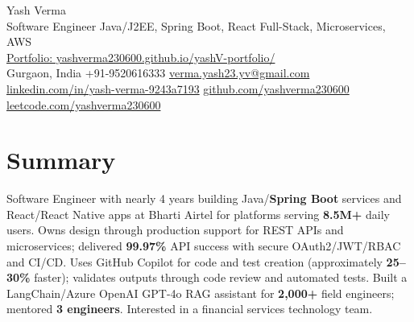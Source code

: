 \documentclass[letterpaper,11pt]{article}
\begin{document}
\begin{center}
  {\Huge Yash Verma} \\
  \small Software Engineer \textbar{} Java/J2EE, Spring Boot, React \textbar{} Full-Stack, Microservices, AWS \\
  \href{https://yashverma230600.github.io/yashV-portfolio/}{Portfolio: yashverma230600.github.io/yashV-portfolio/} \\
  \vspace{8pt}
  \small
  Gurgaon, India \textbar{}
  +91-9520616333 \textbar{}
  \href{mailto:verma.yash23.yv@gmail.com}{verma.yash23.yv@gmail.com} \textbar{}
  \href{https://www.linkedin.com/in/yash-verma-9243a7193/}{linkedin.com/in/yash-verma-9243a7193} \textbar{}
  \href{https://github.com/yashverma230600}{github.com/yashverma230600} \textbar{}
  \href{https://leetcode.com/yashverma230600}{leetcode.com/yashverma230600}
  \vspace{-8pt}
\end{center}

\section{Summary}
\begin{itemize}[leftmargin=0.15in, label={}]
  \small{\item{
    Software Engineer with nearly 4 years building Java/\textbf{Spring Boot} services and React/React Native apps at Bharti Airtel for platforms serving \textbf{8.5M+} daily users. Owns design through production support for REST APIs and microservices; delivered \textbf{99.97\%} API success with secure OAuth2/JWT/RBAC and CI/CD. Uses GitHub Copilot for code and test creation (approximately \textbf{25--30\%} faster); validates outputs through code review and automated tests. %
    Built a LangChain/Azure OpenAI GPT-4o RAG assistant for \textbf{2,000+} field engineers; mentored \textbf{3 engineers}. Interested in a financial services technology team.
  }}
\end{itemize}
\vspace{-8pt}

\end{document}
